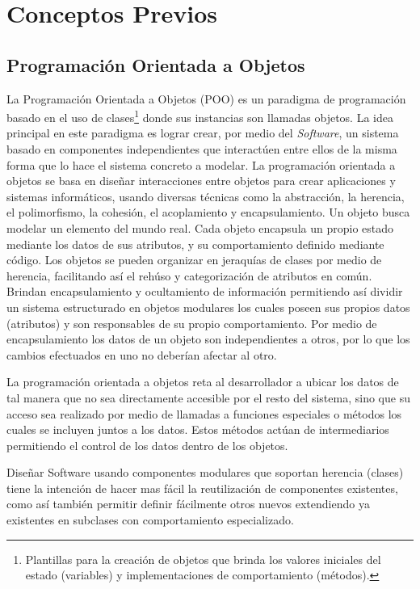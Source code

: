 \chapter{Conceptos Previos}

\section{Programaci\'on Orientada a Objetos}
La Programaci\'on Orientada a Objetos (POO) \cite{poo} es un paradigma de programaci\'on basado en el uso de clases\footnote{Plantillas para la creaci\'on de objetos que brinda los valores iniciales del estado (variables) y implementaciones de comportamiento (m\'etodos).} donde sus instancias son llamadas objetos. La idea principal en este paradigma es lograr crear, por medio del \textit{Software}, un sistema basado en componentes independientes que interact\'uen entre ellos de la misma forma que lo hace el sistema concreto a modelar. La programaci\'on orientada a objetos se basa en dise\~nar interacciones entre objetos para crear aplicaciones y sistemas inform\'aticos, usando diversas t\'ecnicas como la abstracci\'on, la herencia, el polimorfismo, la cohesi\'on, el acoplamiento y encapsulamiento. Un objeto busca modelar un elemento del mundo real. Cada objeto encapsula un propio estado mediante los datos de sus atributos, y su comportamiento definido mediante c\'odigo. Los objetos se pueden organizar en jeraqu\'ias de clases por medio de herencia, facilitando as\'i el reh\'uso y categorizaci\'on de atributos en com\'un. Brindan encapsulamiento y ocultamiento de informaci\'on permitiendo as\'i dividir un sistema estructurado en objetos modulares los cuales poseen sus propios datos (atributos) y son responsables de su propio comportamiento. Por medio de encapsulamiento los datos de un objeto son independientes a otros, por lo que los cambios efectuados en uno no deber\'ian afectar al otro.

La programaci\'on orientada a objetos reta al desarrollador a ubicar los datos de tal manera que no sea directamente accesible por el resto del sistema, sino que su acceso sea realizado por medio de llamadas a funciones especiales o m\'etodos los cuales se incluyen juntos a los datos. Estos m\'etodos act\'uan de intermediarios permitiendo el control de los datos dentro de los objetos.

Dise\~nar Software usando componentes modulares que soportan herencia (clases) tiene la intenci\'on de hacer mas f\'acil la reutilizaci\'on de componentes existentes, como as\'i tambi\'en permitir definir f\'acilmente otros nuevos extendiendo ya existentes en subclases con comportamiento  especializado.

